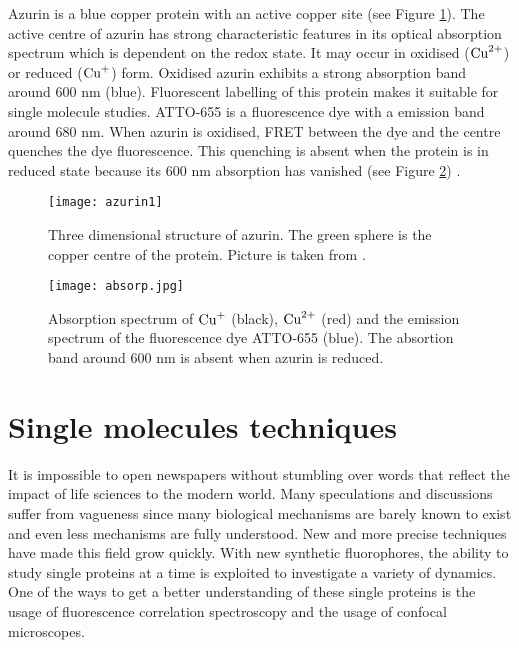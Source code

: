 \documentclass[twoside,single]{lion-msc}
\begin{document}
Azurin is a blue copper protein with an active copper site (see Figure \ref{azurin}). The active centre of azurin has strong characteristic features in its optical absorption spectrum which is dependent on the redox state. It may occur in oxidised ($\textup{Cu}^{2+}$) or reduced ($\textup{Cu}^{+}$) form. Oxidised azurin exhibits a strong absorption band around 600 nm (blue). Fluorescent labelling of this protein makes it suitable for single molecule studies. ATTO-655 is a fluorescence dye with a emission band around 680 nm. When azurin is oxidised, FRET between the dye and the centre quenches the dye fluorescence. This quenching is absent when the protein is in reduced state because its 600 nm absorption has vanished (see Figure \ref{absorption}) \cite{Tabares2014}.

\begin{figure}[ht!]
\centering
\texttt{[image: azurin1]}
\caption{Three dimensional structure of azurin. The green sphere is the copper centre of the protein. Picture is taken from \cite{BORMAN2010}.} 
\label{azurin}
\end{figure}

\begin{figure}[ht!]
\centering
\texttt{[image: absorp.jpg]}
\caption{Absorption spectrum of $\textup{Cu}^{+}$ (black), $\textup{Cu}^{2+}$ (red) and the emission spectrum of the fluorescence dye ATTO-655 (blue). The absortion band around 600 nm is absent when azurin is reduced.} 
\label{absorption}
\end{figure}


\section{Single molecules techniques}
It is impossible to open newspapers without stumbling over words that reflect the impact of life sciences to the modern world. Many speculations and discussions suffer from vagueness since many biological mechanisms are barely known to exist and even less mechanisms are fully understood. New and more precise techniques have made this field grow quickly. With new synthetic fluorophores, the ability to study single proteins at a time is exploited to investigate a variety of dynamics.  One of the ways to get a better understanding of these single proteins is the usage of fluorescence correlation spectroscopy and the usage of confocal microscopes. 
\end{document}
